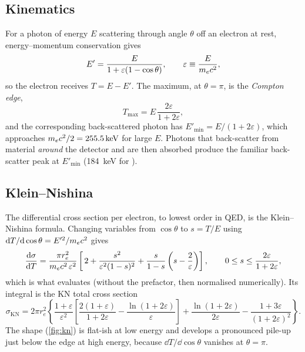 \subsection{Kinematics}
For a photon of energy $E$ scattering through angle $\theta$ off an electron at rest, energy--momentum conservation gives
\begin{equation}
E' = \frac{E}{1 + \varepsilon(1-\cos\theta)}, \qquad \varepsilon \equiv \frac{E}{m_e c^2},
\label{eq:compton}
\end{equation}
so the electron receives $T = E - E'$. The maximum, at $\theta = \pi$, is the \emph{Compton edge},
\begin{equation}
T_\text{max} = E\,\frac{2\varepsilon}{1+2\varepsilon},
\label{eq:edge}
\end{equation}
and the corresponding back-scattered photon has $E'_\text{min} = E/(1+2\varepsilon)$, which approaches $m_e c^2/2 = \SI{255.5}{keV}$ for large $E$. Photons that back-scatter from material \emph{around} the detector and are then absorbed produce the familiar back-scatter peak at $E'_\text{min}$ (\SI{184}{keV} for ).

\subsection{Klein--Nishina}
The differential cross section per electron, to lowest order in QED, is the Klein--Nishina formula. Changing variables from $\cos\theta$ to $s = T/E$ using $\mathrm{d} T/\mathrm{d}\cos\theta = E'^2/m_e c^2$ gives
\begin{equation}
\frac{\mathrm{d}\sigma}{\mathrm{d} T} = \frac{\pi r_e^2}{m_e c^2\,\varepsilon^2}
\left[\,2 + \frac{s^2}{\varepsilon^2(1-s)^2} + \frac{s}{1-s}\left(s - \frac{2}{\varepsilon}\right)\right],
\qquad 0 \le s \le \frac{2\varepsilon}{1+2\varepsilon},
\label{eq:kn}
\end{equation}
which is what  evaluates (without the prefactor, then normalised numerically). Its integral is the KN total cross section
\begin{equation}
\sigma_\text{KN} = 2\pi r_e^2\left\{\frac{1+\varepsilon}{\varepsilon^2}\left[\frac{2(1+\varepsilon)}{1+2\varepsilon} - \frac{\ln(1+2\varepsilon)}{\varepsilon}\right] + \frac{\ln(1+2\varepsilon)}{2\varepsilon} - \frac{1+3\varepsilon}{(1+2\varepsilon)^2}\right\}.
\end{equation}
The shape (\cref{fig:kn}) is flat-ish at low energy and develops a pronounced pile-up just below the edge at high energy, because $\dd T/\dd\cos\theta$ vanishes at $\theta=\pi$.

